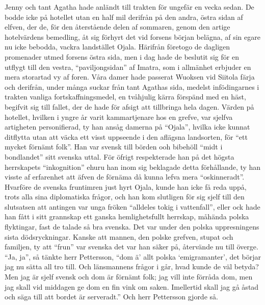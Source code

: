 Jenny och tant Agatha hade anländt till trakten för ungefär en vecka
sedan. De bodde icke på hotellet utan en half mil derifrån på den andra,
östra sidan af elfven, der de, för den återstående delen af sommaren,
genom den artige hotelvärdens bemedling, åt sig förhyrt det vid forsens
början belägna, af sin egare nu icke bebodda, vackra landstället Ojala.
Härifrån företogo de dagligen promenader utmed forsens östra sida, men i
dag hade de beslutit sig för en utflygt till den vestra,
``paviljongsidan'' af Imatra, som i allmänhet erbjuder en mera storartad
vy af foren. Våra damer hade passerat Wuoksen vid Siitola färja och
derifrån, under många suckar från tant Agathas sida, medelst
infödingarnes i trakten vanliga fortskaffningsmedel, en tvåhjulig kärra
förspänd med en häst, begifvit sig till fallet, der de hade för afsigt
att tillbringa hela dagen. Värden på hotellet, hvilken i yngre år varit
kammartjenare hos en grefve, var sjelfva artigheten personifierad, ty
han ansåg damerna på ``Ojala'', hvilka icke kunnat ditflytta utan att
väcka ett visst uppseende i den aflägsna landsorten, för ``ett mycket
förnämt folk''. Han var svensk till börden ooh bibehöll ``midt i
bondlandet'' sitt svenska uttal. För öfrigt respekterade han på det
högsta herrskapets ``inkognition'' ehuru han inom sig beklagade detta
förhållande, ty han visste af erfarenhet att äfven de förnäma då kunna
lefva mera ``oskinneradt''. Hvarföre de svenska fruntimren just hyrt
Ojala, kunde han icke få reda uppå, trots alla sina diplomatiska frågor,
och han kom slutligen för sig sjelf till den slutsatsen att antingen var
unga fröken ``alldeles tokig i vattenfall'', eller ock hade han fått i
sitt grannskap ett ganska hemlighetsfullt herrskap, måhända polska
flyktingar, fast de talade så bra svenska. Det var under den polska
uppresningens sista dödsryckningar. Kanske att mannen, den polske
grefven, stupat och familjen, ty att ``frun'' var svenska det var han
säker på, återvände nu till överge. ``Ja, ja'', så tänkte herr
Pettersson, ``dom ä' allt polska `emigramanter', det börjar jag nu sätta
all tro till. Och länsmannens frågor i går, hvad kunde de väl betyda?
Men jag är sjelf svensk och dom är förnämt folk; jag vill inte förråda
dom, men jag skall vid middagen ge dom en fin vink om saken. Imellertid
skall jag gå åstad och säga till att bordet är serveradt.'' Och herr
Pettersson gjorde så.


